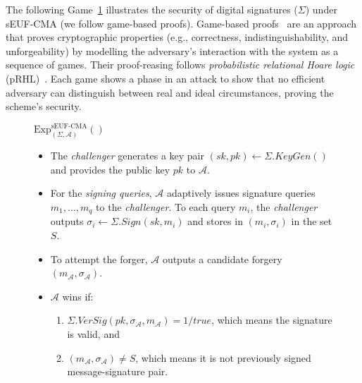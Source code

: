 The following Game~\ref{game:seuf-cma} illustrates the security of digital signatures ($\Sigma$) under sEUF-CMA (we follow game-based proofs).
%
Game-based proofs~\cite{shoup2004sequences} are an approach that proves cryptographic properties (e.g., correctness, indistinguishability, and unforgeability) 
by modelling the adversary's interaction with the system as a sequence of games. 
%
Their proof-reasing follows \textit{probabilistic relational Hoare logic} (pRHL)~\cite{barthe2009formal}.
%
Each game shows a phase in an attack to show that no efficient adversary can distinguish between 
real and ideal circumstances, proving the scheme's security. 
%
\begin{figure}
  \begin{game}\label{game:seuf-cma} %
    \texttt{\underline{$\text{Exp}_{(\Sigma, \mathcal{A})}^{\text{sEUF-CMA}}( )$}}
    \begin{itemize}
      \item The \emph{challenger} generates a key pair $(sk,pk)\leftarrow \Sigma.KeyGen()$ and provides the public key $pk$ to $\mathcal{A}$.
      \item For the \emph{signing queries}, $\mathcal{A}$ adaptively issues signature queries $m_1,\dots,m_q$ to the \emph{challenger}. 
      To each query $m_i$, the \emph{challenger} outputs $\sigma_i \leftarrow \Sigma.Sign(sk, m_i)$ and 
      stores in $(m_i, \sigma_i)$ in the set $S$.
      \item To attempt the forger, $\mathcal{A}$ outputs a candidate forgery $(m_\mathcal{A}, \sigma_\mathcal{A})$.
      \item $\mathcal{A}$ wins if:
      \begin{enumerate}
        \item $\Sigma.VerSig(pk, \sigma_\mathcal{A}, m_\mathcal{A}) = 1/true$, which means the signature is valid, and
        \item $(m_\mathcal{A}, \sigma_\mathcal{A}) \neq S $, which means it is not previously signed message-signature pair.
      \end{enumerate} 
    \end{itemize}
  \end{game}
\end{figure}
%
%
